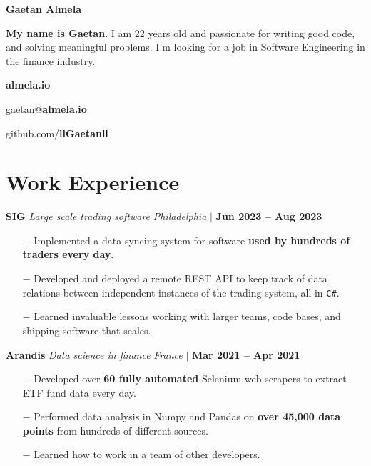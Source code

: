 \documentclass[12pt]{article}
\newcommand{\bigtitle}[5]{
  {\bf \large #1} \textemdash{} {\large \it #2} \hfill {#3}

  {\small #4}

  \smallskip

  {#5} %

  \medskip
}
\begin{document}
    {\fontsize{40}{50} \selectfont \bf \intertabular Gaetan Almela}

    \smallskip

    {\bf My name is Gaetan}. I am 22 years old and passionate for writing good
    code, and solving meaningful problems. I'm looking for a job in Software
    Engineering in the finance industry.

    \begin{center}
      \begin{multicols}{3}
       {\bf almela.io}

       gaetan@{\bf almela.io}

       github.com/{\bf llGaetanll}
      \end{multicols}
    \end{center}

    \section{Work Experience}

    \smallskip

    \bigtitle{SIG}{Large scale trading software}
    {
      \textit{Philadelphia} $\big|$ \textbf{Jun 2023 -- Aug 2023}
    }
    {}
    {
      \begin{itemize}
        \item[$-$] Implemented a data syncing system for software {\bf used by
          hundreds of traders every day}.
        \item[$-$] Developed and deployed a remote REST API to keep track of data
          relations between independent instances of the trading system, all in
          \texttt{C\#}.
        \item[$-$] Learned invaluable lessons working with larger teams,
          code bases, and shipping software that scales.
      \end{itemize}
    }

    \bigtitle{Arandis}{Data science in finance}
    {
      \textit{France} $\big|$ \textbf{Mar 2021 -- Apr 2021}
    }
    {}
    {
      \begin{itemize}
        \item[$-$] Developed over {\bf 60 fully automated} Selenium web scrapers to extract
              ETF fund data every day.
        \item[$-$] Performed data analysis in Numpy and Pandas on {\bf over
              45,000 data points} from hundreds of different sources.
        \item[$-$] Learned how to work in a team of other developers.
      \end{itemize}
    }
\end{document}

